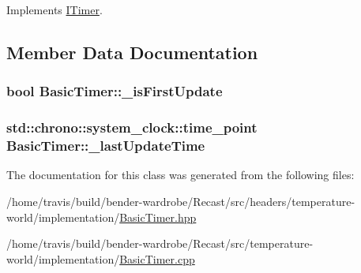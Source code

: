 Implements \hyperlink{class_i_timer_afa6c0d962817423715ce9f944f1b6a2c}{I\-Timer}.



\subsection{Member Data Documentation}
\hypertarget{class_basic_timer_ad6cf70a8d3049db0428aed9d6f4fbf31}{
\subsubsection[{\-\_\-is\-First\-Update}]{\setlength{\rightskip}{0pt plus 5cm}bool Basic\-Timer\-::\-\_\-is\-First\-Update\hspace{0.3cm}{\ttfamily [protected]}}}\label{class_basic_timer_ad6cf70a8d3049db0428aed9d6f4fbf31}
\hypertarget{class_basic_timer_a1c5ab332f195b367d5fbf91183f4dc8a}{
\subsubsection[{\-\_\-last\-Update\-Time}]{\setlength{\rightskip}{0pt plus 5cm}std\-::chrono\-::system\-\_\-clock\-::time\-\_\-point Basic\-Timer\-::\-\_\-last\-Update\-Time\hspace{0.3cm}{\ttfamily [protected]}}}\label{class_basic_timer_a1c5ab332f195b367d5fbf91183f4dc8a}


The documentation for this class was generated from the following files\-:\begin{DoxyCompactItemize}
\item 
/home/travis/build/bender-\/wardrobe/\-Recast/src/headers/temperature-\/world/implementation/\hyperlink{_basic_timer_8hpp}{Basic\-Timer.\-hpp}\item 
/home/travis/build/bender-\/wardrobe/\-Recast/src/temperature-\/world/implementation/\hyperlink{_basic_timer_8cpp}{Basic\-Timer.\-cpp}\end{DoxyCompactItemize}
